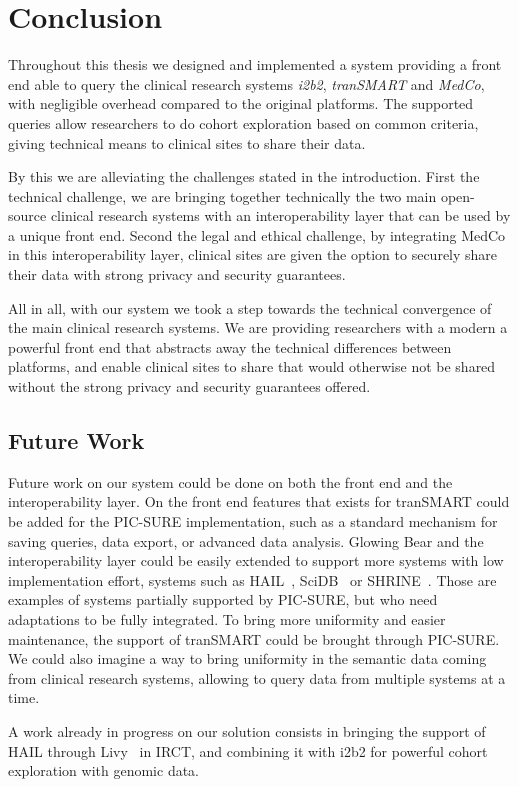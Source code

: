 \chapter{Conclusion}
\label{sec:conclusion}

Throughout this thesis we designed and implemented a system providing a front end able to query the clinical research systems \emph{i2b2}, \emph{tranSMART} and \emph{MedCo}, with negligible overhead compared to the original platforms.
The supported queries allow researchers to do cohort exploration based on common criteria, giving technical means to clinical sites to share their data.

%
By this we are alleviating the challenges stated in the introduction.
First the technical challenge, we are bringing together technically the two main open-source clinical research systems with an interoperability layer that can be used by a unique front end.
Second the legal and ethical challenge, by integrating MedCo in this interoperability layer, clinical sites are given the option to securely share their data with strong privacy and security guarantees.

All in all, with our system we took a step towards the technical convergence of the main clinical research systems.
We are providing researchers with a modern a powerful front end that abstracts away the technical differences between platforms, and enable clinical sites to share that would otherwise not be shared without the strong privacy and security guarantees offered. 



\section{Future Work}
\label{sec:futurework}

Future work on our system could be done on both the front end and the interoperability layer.
On the front end features that exists for tranSMART could be added for the PIC-SURE implementation, such as a standard mechanism for saving queries, data export, or advanced data analysis.
Glowing Bear and the interoperability layer could be easily extended to support more systems with low implementation effort, systems such as HAIL~\cite{hail}, SciDB~\cite{brown2010overview} or SHRINE~\cite{shrine}.
Those are examples of systems partially supported by PIC-SURE, but who need adaptations to be fully integrated.
To bring more uniformity and easier maintenance, the support of tranSMART could be brought through PIC-SURE.
We could also imagine a way to bring uniformity in the semantic data coming from clinical research systems, allowing to query data from multiple systems at a time.

A work already in progress on our solution consists in bringing the support of HAIL through Livy~\cite{livy} in IRCT, and combining it with i2b2 for powerful cohort exploration with genomic data.
